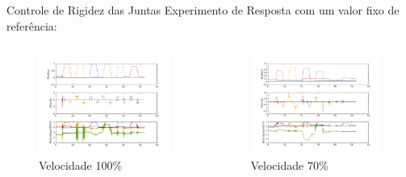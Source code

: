\documentclass{beamer}
\begin{document}
\begin{frame}{Controle de Rigidez das Juntas}
Experimento de Resposta com um valor fixo de referência:
\begin{columns}
\begin{column}{0.5\textwidth}
   \begin{figure}
    \centering
    \includegraphics[width = \linewidth]{tex/figs/jointIdentificationFullSpeed_stiff90p.png}
    \caption{Velocidade 100\%}
    \label{fig:mekademo}
\end{figure}
\end{column}
\begin{column}{0.5\textwidth}  %
    \begin{figure}
    \centering
    \includegraphics[width = \linewidth]{tex/figs/jointIdentificationFullSpeed_stiff10p.png}
    \caption{Velocidade 70\%}
    \label{fig:mekademo}
\end{figure}
\end{column}
\end{columns}
\end{frame}
\end{document}
